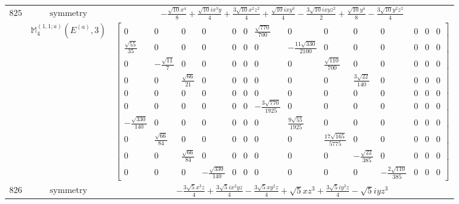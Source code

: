 \documentclass[fleqn,8pt,landscape]{jsarticle}
\begin{document}
\begin{longtable}{ccc}
$ 825 $ & $ \text{symmetry} $ & $ - \frac{\sqrt{10} x^{4}}{8} + \frac{\sqrt{10} i x^{3} y}{4} + \frac{3 \sqrt{10} x^{2} z^{2}}{4} + \frac{\sqrt{10} i x y^{3}}{4} - \frac{3 \sqrt{10} i x y z^{2}}{2} + \frac{\sqrt{10} y^{4}}{8} - \frac{3 \sqrt{10} y^{2} z^{2}}{4} $ \\
$  $ & $ \mathbb{M}_{4}^{(1,1;a)}(E^{(a)},3) $ & $ \begin{bmatrix} 0 & 0 & 0 & 0 & 0 & 0 & \frac{\sqrt{770}}{700} & 0 & 0 & 0 & 0 & 0 & 0 & 0 \\ \frac{\sqrt{55}}{35} & 0 & 0 & 0 & 0 & 0 & 0 & - \frac{11 \sqrt{330}}{2100} & 0 & 0 & 0 & 0 & 0 & 0 \\ 0 & - \frac{\sqrt{11}}{7} & 0 & 0 & 0 & 0 & 0 & 0 & \frac{\sqrt{110}}{700} & 0 & 0 & 0 & 0 & 0 \\ 0 & 0 & \frac{\sqrt{66}}{21} & 0 & 0 & 0 & 0 & 0 & 0 & \frac{3 \sqrt{22}}{140} & 0 & 0 & 0 & 0 \\ 0 & 0 & 0 & 0 & 0 & 0 & 0 & 0 & 0 & 0 & 0 & 0 & 0 & 0 \\ 0 & 0 & 0 & 0 & 0 & 0 & - \frac{3 \sqrt{770}}{1925} & 0 & 0 & 0 & 0 & 0 & 0 & 0 \\ - \frac{\sqrt{330}}{140} & 0 & 0 & 0 & 0 & 0 & 0 & \frac{9 \sqrt{55}}{1925} & 0 & 0 & 0 & 0 & 0 & 0 \\ 0 & \frac{\sqrt{66}}{84} & 0 & 0 & 0 & 0 & 0 & 0 & \frac{17 \sqrt{165}}{5775} & 0 & 0 & 0 & 0 & 0 \\ 0 & 0 & \frac{\sqrt{66}}{84} & 0 & 0 & 0 & 0 & 0 & 0 & - \frac{\sqrt{22}}{385} & 0 & 0 & 0 & 0 \\ 0 & 0 & 0 & - \frac{\sqrt{330}}{140} & 0 & 0 & 0 & 0 & 0 & 0 & - \frac{2 \sqrt{110}}{385} & 0 & 0 & 0 \end{bmatrix} $ \\ \hline
$ 826 $ & $ \text{symmetry} $ & $ - \frac{3 \sqrt{5} x^{3} z}{4} + \frac{3 \sqrt{5} i x^{2} y z}{4} - \frac{3 \sqrt{5} x y^{2} z}{4} + \sqrt{5} x z^{3} + \frac{3 \sqrt{5} i y^{3} z}{4} - \sqrt{5} i y z^{3} $ \\

\end{longtable}
\end{document}
